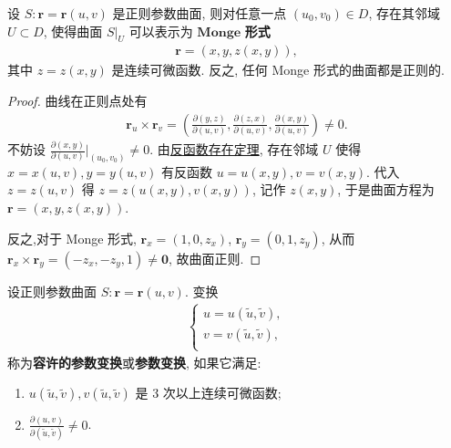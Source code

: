 \documentclass[../../main.tex]{subfiles}%
\begin{document}
\begin{theorem}
设 \( S : \bm{r} = \bm{r}(u, v) \) 是正则参数曲面, 则对任意一点 \( (u_0, v_0) \in D \), 存在其邻域 \( U \subset D \), 使得曲面 \( S|_U \) 可以表示为 $\mathbf{Monge}$ \textbf{形式}
\begin{align*}
\bm{r} = (x, y, z(x, y)),
\end{align*}
其中 \( z = z(x, y) \) 是连续可微函数. 反之, 任何 Monge 形式的曲面都是正则的.
\end{theorem}
\begin{proof}

曲线在正则点处有
\begin{align*}
\boldsymbol{r}_u\times \boldsymbol{r}_v=\left( \frac{\partial \left( y,z \right)}{\partial \left( u,v \right)},\frac{\partial \left( z,x \right)}{\partial \left( u,v \right)},\frac{\partial \left( x,y \right)}{\partial \left( u,v \right)} \right) \ne 0.
\end{align*}
不妨设 \( \frac{\partial(x, y)}{\partial(u, v)}\big|_{(u_0, v_0)} \neq 0 \). 由\hyperref[Basis-of-Analytics-theorem:反函数存在定理]{反函数存在定理}, 存在邻域 \( U \) 使得 \( x = x(u, v), y = y(u, v) \) 有反函数 \( u = u(x, y), v = v(x, y) \). 代入 \( z = z(u, v) \) 得 \( z = z(u(x, y), v(x, y)) \), 记作 \( z(x, y) \), 于是曲面方程为 \( \bm{r} = (x, y, z(x, y)) \). 

反之,对于 Monge 形式, \( \bm{r}_x = (1, 0, z_x) \), \( \bm{r}_y = (0, 1, z_y) \), 从而 \( \bm{r}_x \times \bm{r}_y = (-z_x, -z_y, 1) \neq \bm{0} \), 故曲面正则.

\end{proof}

\begin{definition}
设正则参数曲面 \( S : \bm{r} = \bm{r}(u, v) \). 变换
\begin{align*}
\begin{cases}
u=u(\tilde{u},\tilde{v}),\\
v=v(\tilde{u},\tilde{v}),\\
\end{cases}
\end{align*}
称为\textbf{容许的参数变换}或\textbf{参数变换}, 如果它满足:
\begin{enumerate}[(1)]
\item \( u(\tilde{u}, \tilde{v}), v(\tilde{u}, \tilde{v}) \) 是 3 次以上连续可微函数;
\item \( \frac{\partial(u, v)}{\partial(\tilde{u}, \tilde{v})} \neq 0 \).
\end{enumerate}
\end{definition}
\end{document}
